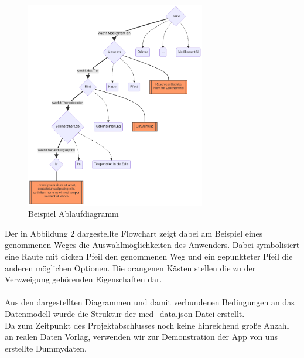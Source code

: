 \documentclass[a4paper]{article}
\begin{document}
    \begin{figure}[h]
        \centering
        \includegraphics[width=0.7\textwidth]{flow_chart.png}
        \caption{Beispiel Ablaufdiagramm }
    \end{figure}

Der in Abbildung 2 dargestellte Flowchart zeigt dabei am Beispiel eines genommenen Weges die Auswahlmöglichkeiten des Anwenders. Dabei symbolisiert eine Raute mit dicken Pfeil 
den genommenen Weg und ein gepunkteter Pfeil die anderen möglichen Optionen. Die orangenen Kästen stellen die zu der Verzweigung gehörenden Eigenschaften dar. \\ \\

Aus den dargestellten Diagrammen und damit verbundenen Bedingungen an das Datenmodell wurde die Struktur der med\_data.json Datei erstellt. \\

Da zum Zeitpunkt des Projektabschlusses noch keine hinreichend große Anzahl an realen Daten Vorlag, verwenden wir zur Demonstration der App von uns erstellte Dummydaten.

    
\end{document}
